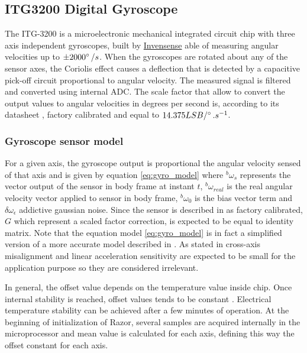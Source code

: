\subsection{ITG3200 Digital Gyroscope} \label{subsection:itg3200}

The ITG-3200 is a microelectronic mechanical integrated circuit chip with three
axis independent gyroscopes, built by
\href{http://www.invensense.com/}{Invensense} able of measuring angular
velocities up to $\pm2000^\circ\,/s$. When the gyroscopes are rotated about any
of the sensor axes, the Coriolis effect causes a deflection that is  detected by
a capacitive pick-off circuit proportional to angular velocity. The measured signal is filtered and converted using internal \gls{ADC}. The scale factor that allow to convert the
output values to angular velocities in degrees per second is, according to its
datasheet \cite{itg3200_datasheet}, factory calibrated and equal to
$14.375LSB/^\circ\,.s^{-1}$.

\subsubsection{Gyroscope sensor model} \label{subsubsection:itg3200model}


For a given axis, the gyroscope output is proportional the angular velocity
sensed of that axis and is given by equation \eqref{eq:gyro_model} where
${}^b\omega_{s}$ represents the vector output of the sensor in body
frame at instant $t$, ${}^b\omega_{real}$ is the real angular velocity
vector applied to sensor in body frame, ${}^b\omega_{0}$ is the bias
vector term and $\delta\omega_{\epsilon}$ addictive gaussian noise.
Since the sensor is described in \cite{itg3200_datasheet} as factory calibrated,
$G$ which represent a scaled factor correction, is expected to be equal to
identity matrix. Note that the equation model \eqref{eq:gyro_model} is in fact a
simplified version of a more accurate model described in
\cite{Vectornav_calibration}. As stated in \cite{Vectornav_calibration}
cross-axis misalignment and linear acceleration sensitivity are expected to be
small for the application purpose so they are considered irrelevant.

In general, the offset value depends on the temperature value inside chip. Once
internal stability is reached, offset values tends to be constant \cite{Woodman2007}. Electrical
temperature stability can be achieved after a few minutes of operation. At the
beginning of initialization of Razor, several samples are acquired internally in
the microprocessor and  mean value is calculated for each axis, defining this
way the offset constant for each axis.


